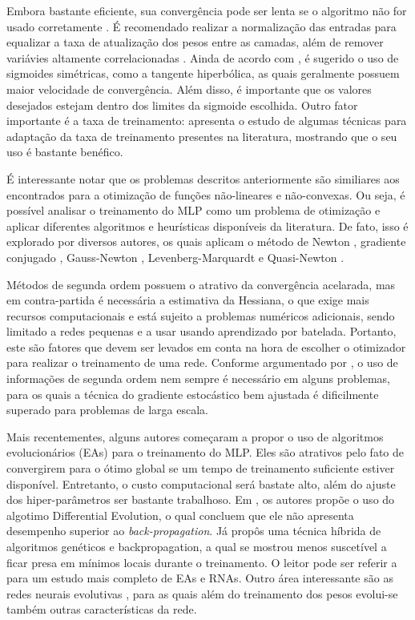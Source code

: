 \documentclass[conference]{IEEEtran}
\begin{document}
	Embora bastante eficiente, sua convergência pode ser lenta se o algoritmo não for usado corretamente \cite{lecun1993efficient}. É recomendado realizar a normalização das entradas para equalizar a taxa de atualização dos pesos entre as camadas, além de remover variávies altamente correlacionadas \cite{lecun2012efficient}. Ainda de acordo com \cite{lecun2012efficient}, é sugerido o uso de sigmoides simétricas, como a tangente hiperbólica, as quais geralmente possuem maior velocidade de convergência. Além disso, é importante que os valores desejados estejam dentro dos limites da sigmoide escolhida. Outro fator importante é a taxa de treinamento: \cite{magoulas1999improving} apresenta o estudo de algumas técnicas para adaptação da taxa de treinamento presentes na literatura, mostrando que o seu uso é bastante benéfico. 
	
	É interessante notar que os problemas descritos anteriormente são similiares aos encontrados para a otimização de funções não-lineares e não-convexas. Ou seja, é possível analisar o treinamento do MLP como um problema de otimização e aplicar diferentes algoritmos e heurísticas disponíveis da literatura. De fato, isso é explorado por diversos autores, os quais aplicam o método de Newton \cite{becker1988improving}, gradiente conjugado \cite{johansson1991backpropagation}, Gauss-Newton \cite{battiti1992first}, Levenberg-Marquardt \cite{hagan1994training} e Quasi-Newton \cite{robitaille1996modified}.  
	
	Métodos de segunda ordem possuem o atrativo da convergência acelarada, mas em contra-partida é necessária a estimativa da Hessiana, o que exige mais recursos computacionais e está sujeito a problemas numéricos adicionais, sendo limitado a redes pequenas e a usar usando aprendizado por batelada. Portanto, este são fatores que devem ser levados em conta na hora de escolher o otimizador para realizar o treinamento de uma rede. Conforme argumentado por \cite{lecun2012efficient}, o uso de informações de segunda ordem nem sempre é necessário em alguns problemas, para os quais a técnica do gradiente estocástico bem ajustada é dificilmente superado para problemas de larga escala.
	
	Mais recentementes, alguns autores começaram a propor o uso de algoritmos evolucionários (EAs) para o treinamento do MLP. Eles são atrativos pelo fato de convergirem para o ótimo global se um tempo de treinamento suficiente estiver disponível. Entretanto, o custo computacional será bastate alto, além do ajuste dos hiper-parâmetros ser bastante trabalhoso. Em \cite{ilonen2003differential}, os autores propõe o uso do algotimo Differential Evolution, o qual concluem que ele não apresenta desempenho superior ao \textit{back-propagation}. Já \cite{ding2011optimizing} propôs uma técnica híbrida de algoritmos genéticos e backpropagation, a qual se mostrou menos suscetível a ficar presa em mínimos locais durante o treinamento. O leitor pode ser referir a \cite{mirjalili2019evolutionary} para um estudo mais completo de EAs e RNAs. Outro área interessante são as redes neurais evolutivas \cite{yao1999evolving}, para as quais além do treinamento dos pesos evolui-se também outras características da rede.
	
\end{document}

